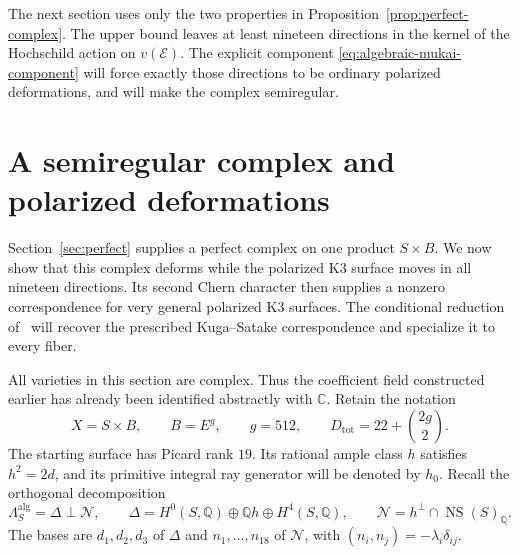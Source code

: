 \documentclass[11pt]{article}
\numberwithin{equation}{section}
\theoremstyle{definition}
\theoremstyle{remark}
\begin{document}
The next section uses only the two properties in
Proposition~\ref{prop:perfect-complex}.  The upper bound leaves at
least nineteen directions in the kernel of the Hochschild action on
$v(\mathcal E)$.  The explicit component
\eqref{eq:algebraic-mukai-component} will force exactly those
directions to be ordinary polarized deformations, and will make the
complex semiregular.


\section{A semiregular complex and polarized deformations}
\label{sec:deformation}

Section~\ref{sec:perfect} supplies a perfect complex on one product
$S\times B$. We now show that this complex deforms while the polarized
K3 surface moves in all nineteen directions. Its second Chern character
then supplies a nonzero correspondence for very general polarized K3
surfaces. The conditional reduction of~\cite{R} will recover the
prescribed Kuga--Satake correspondence and specialize it to every fiber.

All varieties in this section are complex. Thus the coefficient field
constructed earlier has already been identified abstractly with $\mathbb C$.
Retain the notation
\[
 X=S\times B,\qquad B=E^g,\qquad g=512,\qquad
 D_{\mathrm{tot}}=22+\binom{2g}{2}.
\]
The starting surface has Picard rank $19$. Its rational ample class $h$
satisfies $h^2=2d$, and its primitive integral ray generator will be
denoted by $h_0$. Recall the orthogonal decomposition
\[
 \Lambda_S^{\mathrm{alg}}
 =\Delta\mathbin{\perp}\mathcal N,\qquad
 \Delta=H^0(S,\mathbb Q)\oplus\mathbb Q h\oplus H^4(S,\mathbb Q),\qquad
 \mathcal N=h^\perp\cap\operatorname{NS}(S)_\mathbb Q.
\]
The bases are $d_1,d_2,d_3$ of $\Delta$ and $n_1,\ldots,n_{18}$ of
$\mathcal N$, with $(n_i,n_j)=-\lambda_i\delta_{ij}$.
\end{document}
